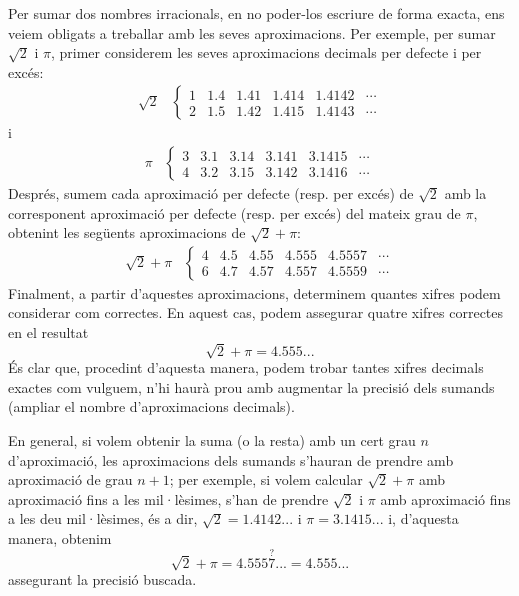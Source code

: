 Per sumar dos nombres irracionals, en no poder-los escriure de forma
exacta, ens veiem obligats a treballar amb les seves aproximacions. Per exemple,
per sumar $\sqrt{2}$ i $\pi $, primer considerem les seves aproximacions
decimals per defecte i per excés:%
\begin{equation*}
\begin{array}{cc}
\sqrt{2} & \left\{ 
\begin{array}{cccccc}
1 & 1.4 & 1.41 & 1.414 & 1.4142 & \cdots \\ 
2 & 1.5 & 1.42 & 1.415 & 1.4143 & \cdots%
\end{array}%
\right.%
\end{array}%
\end{equation*}%
i%
\begin{equation*}
\begin{array}{cc}
\pi & \left\{ 
\begin{array}{cccccc}
3 & 3.1 & 3.14 & 3.141 & 3.1415 & \cdots \\ 
4 & 3.2 & 3.15 & 3.142 & 3.1416 & \cdots%
\end{array}%
\right.%
\end{array}%
\end{equation*}%
Després, sumem cada aproximació per defecte (resp. per excés) de 
$\sqrt{2}$ amb la corresponent aproximació per defecte (resp. per
excés) del mateix grau de $\pi $, obtenint les següents aproximacions
de $\sqrt{2}+\pi $:%
\begin{equation*}
\begin{array}{cc}
\sqrt{2}+\pi & \left\{ 
\begin{array}{cccccc}
4 & 4.5 & 4.55 & 4.555 & 4.5557 & \cdots \\ 
6 & 4.7 & 4.57 & 4.557 & 4.5559 & \cdots%
\end{array}%
\right.%
\end{array}%
\end{equation*}%
Finalment, a partir d’aquestes aproximacions, determinem quantes
xifres podem considerar com correctes. En aquest cas, podem assegurar
quatre xifres correctes en el resultat%
\begin{equation*}
\sqrt{2}+\pi =4.555...
\end{equation*}%
És clar que, procedint d’aquesta manera, podem trobar tantes xifres
decimals exactes com vulguem, n’hi haurà prou amb augmentar la precisió
dels sumands (ampliar el nombre d’aproximacions decimals).

En general, si volem obtenir la suma (o la resta) amb un cert grau $n$
d’aproximació, les aproximacions dels sumands s’hauran de prendre
amb aproximació de grau $n+1$; per exemple, si volem calcular $%
\sqrt{2}+\pi$ amb aproximació fins a les mil·lèsimes, s’han de prendre $%
\sqrt{2}$ i $\pi$ amb aproximació fins a les deu mil·lèsimes, és
a dir, $\sqrt{2}=1.4142...$ i $\pi =3.1415...$ i, d’aquesta manera, obtenim 
\begin{equation*}
\sqrt{2}+\pi =4.555\overset{?}{7}...=4.555...
\end{equation*}%
assegurant la precisió buscada.

